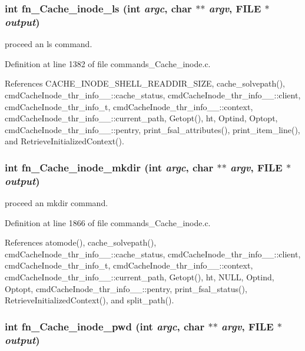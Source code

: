 \subsubsection{\setlength{\rightskip}{0pt plus 5cm}int fn\_\-Cache\_\-inode\_\-ls (int {\em argc}, char $\ast$$\ast$ {\em argv}, FILE $\ast$ {\em output})}\label{commands_8h_a41}


proceed an ls command. 

Definition at line 1382 of file commands\_\-Cache\_\-inode.c.

References CACHE\_\-INODE\_\-SHELL\_\-READDIR\_\-SIZE, cache\_\-solvepath(), cmd\-Cache\-Inode\_\-thr\_\-info\_\-\_\-::cache\_\-status, cmd\-Cache\-Inode\_\-thr\_\-info\_\-\_\-::client, cmd\-Cache\-Inode\_\-thr\_\-info\_\-t, cmd\-Cache\-Inode\_\-thr\_\-info\_\-\_\-::context, cmd\-Cache\-Inode\_\-thr\_\-info\_\-\_\-::current\_\-path, Getopt(), ht, Optind, Optopt, cmd\-Cache\-Inode\_\-thr\_\-info\_\-\_\-::pentry, print\_\-fsal\_\-attributes(), print\_\-item\_\-line(), and Retrieve\-Initialized\-Context().
\subsubsection{\setlength{\rightskip}{0pt plus 5cm}int fn\_\-Cache\_\-inode\_\-mkdir (int {\em argc}, char $\ast$$\ast$ {\em argv}, FILE $\ast$ {\em output})}\label{commands_8h_a43}


proceed an mkdir command. 

Definition at line 1866 of file commands\_\-Cache\_\-inode.c.

References atomode(), cache\_\-solvepath(), cmd\-Cache\-Inode\_\-thr\_\-info\_\-\_\-::cache\_\-status, cmd\-Cache\-Inode\_\-thr\_\-info\_\-\_\-::client, cmd\-Cache\-Inode\_\-thr\_\-info\_\-t, cmd\-Cache\-Inode\_\-thr\_\-info\_\-\_\-::context, cmd\-Cache\-Inode\_\-thr\_\-info\_\-\_\-::current\_\-path, Getopt(), ht, NULL, Optind, Optopt, cmd\-Cache\-Inode\_\-thr\_\-info\_\-\_\-::pentry, print\_\-fsal\_\-status(), Retrieve\-Initialized\-Context(), and split\_\-path().
\subsubsection{\setlength{\rightskip}{0pt plus 5cm}int fn\_\-Cache\_\-inode\_\-pwd (int {\em argc}, char $\ast$$\ast$ {\em argv}, FILE $\ast$ {\em output})}\label{commands_8h_a37}


